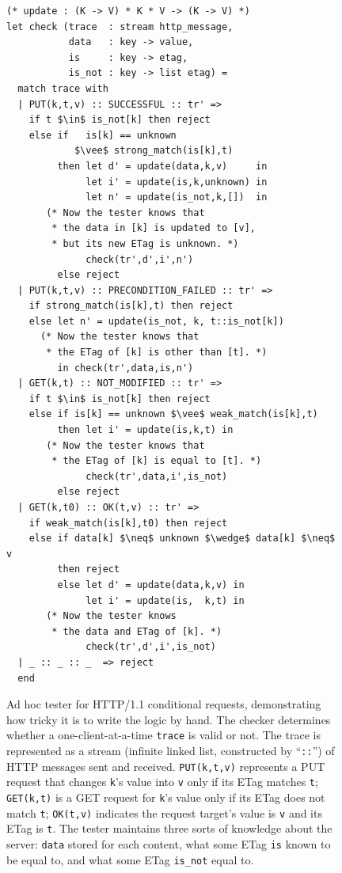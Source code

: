 \documentclass{article}
\newcommand{\http}{HTTP/1.1\xspace}
\newcommand{\ilc}[1]{\lstinline[style=customcoq]{#1}}
\theoremstyle{definition}
\begin{document}
\begin{figure}
  \begin{lstlisting}[style=customcoq,mathescape=true]
(* update : (K -> V) * K * V -> (K -> V) *)
let check (trace  : stream http_message,
           data   : key -> value,
           is     : key -> etag,
           is_not : key -> list etag) =
  match trace with
  | PUT(k,t,v) :: SUCCESSFUL :: tr' =>
    if t $\in$ is_not[k] then reject
    else if   is[k] == unknown
            $\vee$ strong_match(is[k],t)
         then let d' = update(data,k,v)     in
              let i' = update(is,k,unknown) in
              let n' = update(is_not,k,[])  in
       (* Now the tester knows that
        * the data in [k] is updated to [v],
        * but its new ETag is unknown. *)
              check(tr',d',i',n')
         else reject
  | PUT(k,t,v) :: PRECONDITION_FAILED :: tr' =>
    if strong_match(is[k],t) then reject
    else let n' = update(is_not, k, t::is_not[k])
      (* Now the tester knows that
       * the ETag of [k] is other than [t]. *)
         in check(tr',data,is,n')
  | GET(k,t) :: NOT_MODIFIED :: tr' =>
    if t $\in$ is_not[k] then reject
    else if is[k] == unknown $\vee$ weak_match(is[k],t)
         then let i' = update(is,k,t) in
       (* Now the tester knows that
        * the ETag of [k] is equal to [t]. *)
              check(tr',data,i',is_not)
         else reject
  | GET(k,t0) :: OK(t,v) :: tr' =>
    if weak_match(is[k],t0) then reject
    else if data[k] $\neq$ unknown $\wedge$ data[k] $\neq$ v
         then reject
         else let d' = update(data,k,v) in
              let i' = update(is,  k,t) in
       (* Now the tester knows
        * the data and ETag of [k]. *)
              check(tr',d',i',is_not)
  | _ :: _ :: _  => reject
  end
  \end{lstlisting}
  \caption{Ad hoc tester for \http conditional requests, demonstrating how
    tricky it is to write the logic by hand.  The checker determines whether a
    one-client-at-a-time \ilc{trace} is valid or not.  The trace is represented
    as a stream (infinite linked list, constructed by ``\ilc{::}'') of HTTP
    messages sent and received.
    \ilc{PUT(k,t,v)} represents a PUT
    request that changes \ilc{k}'s value into \ilc{v} only if its ETag matches
    \ilc{t}; \ilc{GET(k,t)} is a GET request for \ilc{k}'s value only if its
    ETag does not match \ilc{t}; \ilc{OK(t,v)} indicates the request target's
    value is \ilc{v} and its ETag is \ilc{t}.  The tester maintains three
    sorts of  knowledge about
    the server: \ilc{data} stored for each content, what some
    ETag \ilc{is} known to be equal to, and what some ETag \ilc{is_not} equal
    to.
  }
  \label{fig:etag-tester}
\end{figure}
\end{document}

